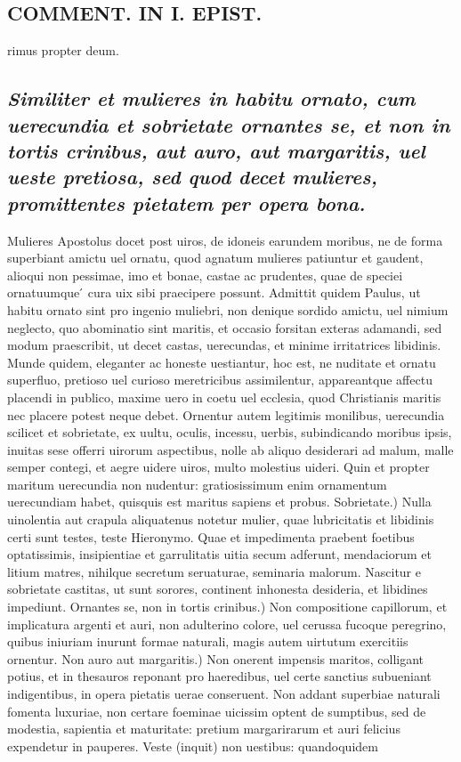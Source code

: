 \documentclass{article}
\begin{document}
\begin{pages}
\section*{COMMENT. IN I. EPIST. }
\marginpar{[ p.486 ]}\pstart rimus propter deum.  \pend
{}
{}
\subsection*{\textit{Similiter et mulieres in habitu ornato, cum uerecundia et sobrietate ornantes se, et non in tortis crinibus, aut auro, aut margaritis, uel ueste pretiosa, sed quod decet mulieres, promittentes pietatem per opera bona. }}\pstart Mulieres Apostolus docet post uiros, de idoneis earundem moribus, ne de forma superbiant amictu uel ornatu, quod agnatum mulieres patiuntur et gaudent, alioqui non pessimae, imo et bonae, castae ac prudentes, quae de speciei ornatuumque ́ cura uix sibi praecipere possunt. Admittit quidem Paulus, ut habitu ornato sint pro ingenio muliebri, non denique sordido amictu, uel nimium neglecto, quo abominatio sint maritis, et occasio forsitan exteras adamandi, sed modum praescribit, ut decet castas, uerecundas, et minime irritatrices libidinis. Munde quidem, eleganter ac honeste uestiantur, hoc est, ne nuditate et ornatu superfluo, pretioso uel curioso meretricibus assimilentur, appareantque affectu placendi in publico, maxime uero in coetu uel ecclesia, quod Christianis maritis nec placere potest neque debet. Ornentur autem legitimis monilibus, uerecundia scilicet et sobrietate, ex uultu, oculis, incessu, uerbis, subindicando moribus ipsis, inuitas sese offerri uirorum aspectibus, nolle ab aliquo desiderari ad malum, malle semper contegi, et aegre uidere uiros, multo molestius uideri. Quin et propter maritum uerecundia non nudentur: gratiosissimum enim ornamentum uerecundiam habet, quisquis est maritus sapiens et probus. Sobrietate.) Nulla uinolentia aut crapula aliquatenus notetur mulier, quae lubricitatis et libidinis certi sunt testes, teste Hieronymo. Quae et impedimenta praebent foetibus optatissimis, insipientiae et garrulitatis uitia secum adferunt, mendaciorum et litium matres, nihilque secretum seruaturae, seminaria malorum. Nascitur e sobrietate castitas, ut sunt sorores, continent inhonesta desideria, et libidines impediunt. Ornantes se, non in tortis crinibus.) Non compositione capillorum, et implicatura argenti et auri, non adulterino colore, uel cerussa fucoque peregrino, quibus iniuriam inurunt formae naturali, magis autem uirtutum exercitiis ornentur. Non auro aut margaritis.) Non onerent impensis maritos, colligant potius, et in thesauros reponant pro haeredibus, uel certe sanctius subueniant indigentibus, in opera pietatis uerae conseruent. Non addant superbiae naturali fomenta luxuriae, non certare foeminae uicissim optent de sumptibus, sed de modestia, sapientia et maturitate: pretium margarirarum et auri felicius expendetur in pauperes. Veste (inquit) non uestibus: quandoquidem 
\end{pages}
\end{document}
